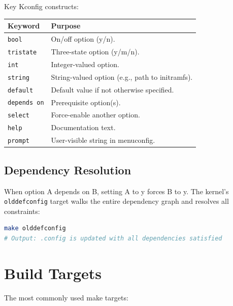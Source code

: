 Key Kconfig constructs:

\begin{longtable}{|p{3cm}|p{10cm}|}
\hline
\textbf{Keyword} & \textbf{Purpose} \\
\hline
\texttt{bool} & On/off option (y/n). \\
\texttt{tristate} & Three-state option (y/m/n). \\
\texttt{int} & Integer-valued option. \\
\texttt{string} & String-valued option (e.g., path to initramfs). \\
\texttt{default} & Default value if not otherwise specified. \\
\texttt{depends on} & Prerequisite option(s). \\
\texttt{select} & Force-enable another option. \\
\texttt{help} & Documentation text. \\
\texttt{prompt} & User-visible string in menuconfig. \\
\hline
\end{longtable}

\subsection{Dependency Resolution}

When option A depends on B, setting A to y forces B to y. The kernel's
\texttt{olddefconfig} target walks the entire dependency graph and
resolves all constraints:

\begin{lstlisting}[language=bash]
make olddefconfig
# Output: .config is updated with all dependencies satisfied
\end{lstlisting}

\section{Build Targets}

The most commonly used make targets:


